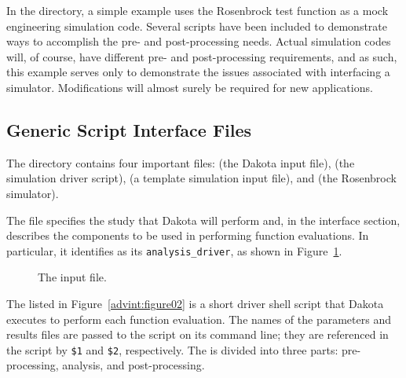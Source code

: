 In the  directory,
a simple example uses the Rosenbrock test function as a mock
engineering simulation code. Several scripts have been included to
demonstrate ways to accomplish the pre- and post-processing
needs. Actual simulation codes will, of course, have different pre-
and post-processing requirements, and as such, this example serves
only to demonstrate the issues associated with interfacing a
simulator. Modifications will almost surely be required for new
applications.

\subsection{Generic Script Interface Files}\label{interfaces:generic}

The 
directory contains four important files:
 (the Dakota input file),
 (the simulation driver script),
 (a template simulation input file), and
 (the Rosenbrock simulator).

The file  specifies the study that
Dakota will perform and, in the interface section, describes the
components to be used in performing function evaluations. In
particular, it identifies  as its
\texttt{analysis\_driver}, as shown in Figure~\ref{advint:figure01}.
\begin{figure}
  \centering
  \begin{bigbox}
    \begin{small}
    \end{small}
  \end{bigbox}
  \caption{The \protect{} input file.}
  \label{advint:figure01}
\end{figure}

The  listed in Figure~\ref{advint:figure02}
is a short driver shell script that Dakota executes to perform each
function evaluation. The names of the parameters and results files are
passed to the script on its command line; they are
referenced in the script by \texttt{\$1}
and \texttt{\$2}, respectively. The 
is divided into three parts: pre-processing, analysis, and post-processing.

